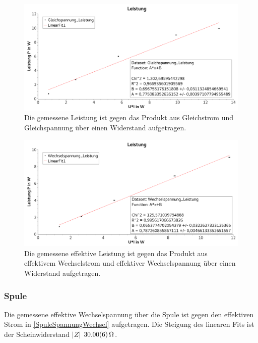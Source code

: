 \documentclass[
	a4paper,
	12pt,
	pagesize,
	ngerman
]{scrartcl}
\begin{document}
	\begin{figure}[tb]
		\includegraphics[width=1\textwidth]{WiderLeistungGleich}
		\centering
		\caption{Die gemessene Leistung ist gegen das Produkt aus Gleichstrom und Gleichspannung über einen Widerstand aufgetragen.} %
		\label{WiderLeistungGleich}
		\centering
	\end{figure}
	
	\begin{figure}[tb]
		\includegraphics[width=1\textwidth]{WiderLeistungWechsel}
		\centering
		\caption{Die gemessene effektive Leistung ist gegen das Produkt aus effektivem Wechselstrom und effektiver Wechselspannung über einen Widerstand aufgetragen.}
		\label{WiderLeistungWechsel}
		\centering
	\end{figure}

	\subsubsection*{Spule}
	Die gemessene effektive Wechselspannung über die Spule ist gegen den effektiven Strom in \cref{SpuleSpannungWechsel} aufgetragen.
	Die Steigung des linearen Fits ist der Scheinwiderstand $|Z|$ $\SI{30,00 \pm 0,06}{\Omega}$. 
	
\end{document}
